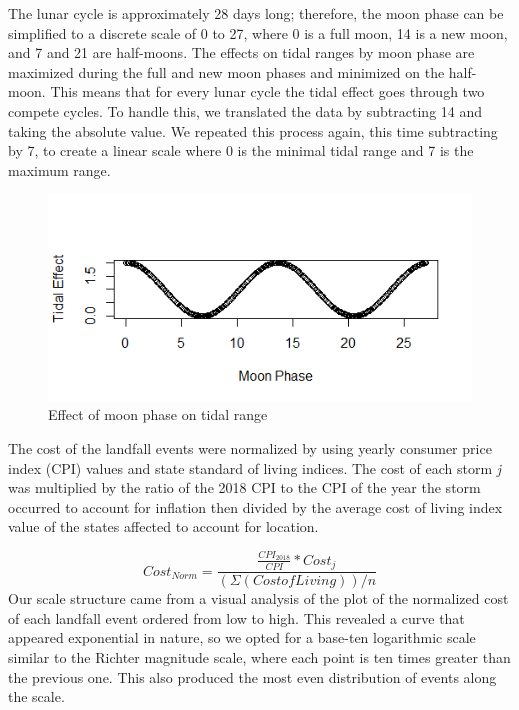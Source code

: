 \documentclass[letterpaper, 10 pt, conference]{ieeeconf}  %
\begin{document}
The lunar cycle is approximately 28 days long; therefore, the moon phase can be simplified to a discrete scale of 0 to 27, where 0 is a full moon, 14 is a new moon, and 7 and 21 are half-moons. The effects on tidal ranges by moon phase are maximized during the full and new moon phases and minimized on the half-moon. This means that for every lunar cycle the tidal effect goes through two compete cycles. To handle this, we translated the data by subtracting 14 and taking the absolute value. We repeated this process again, this time subtracting by 7, to create a linear scale where 0 is the minimal tidal range and 7 is the maximum range.

\begin{figure}[h!]
  \includegraphics[width=\linewidth]{tidal_plot.png}
  \caption{Effect of moon phase on tidal range}
  \label{fig:tidal}
\end{figure}

The cost of the landfall events were normalized by using yearly consumer price index (CPI) values and state standard of living indices. The cost of each storm \textit{j} was multiplied by the ratio of the 2018 CPI to the CPI of the year the storm occurred to account for inflation then divided by the average cost of living index value of the states affected to account for location.

\begin{equation}
{\scriptstyle
 Cost_{Norm}  =   \frac{\frac{CPI_{2018}}{CPI}* Cost_{j}}{( \Sigma ({Cost of Living}) )/{n} } }
\end{equation}
 Our scale structure came from a visual analysis of the plot of the normalized cost of each landfall event ordered from low to high. This revealed a curve that appeared exponential in nature, so we opted for a base-ten logarithmic scale similar to the Richter magnitude scale, where each point is ten times greater than the previous one. This also produced the most even distribution of events along the scale.  
\end{document}

